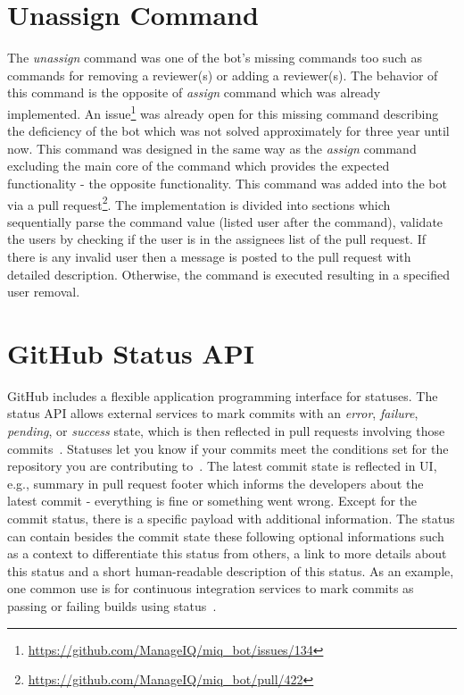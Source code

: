 \section{Unassign Command}

The \textit{unassign} command was one of the bot's missing commands too such as commands for removing a reviewer(s) or adding a reviewer(s). The behavior of this command is the opposite of \textit{assign} command which was already implemented. An issue\footnote{\url{https://github.com/ManageIQ/miq_bot/issues/134}} was already open for this missing command describing the deficiency of the bot which was not solved approximately for three year until now. This command was designed in the same way as the \textit{assign} command excluding the main core of the command which provides the expected functionality - the opposite functionality. This command was added into the bot via a pull request\footnote{\url{https://github.com/ManageIQ/miq_bot/pull/422}}. The implementation is divided into sections which sequentially parse the command value (listed user after the command), validate the users by checking if the user is in the assignees list of the pull request. If there is any invalid user then a message is posted to the pull request with detailed description. Otherwise, the command is executed resulting in a specified user removal.

\section{GitHub Status API}

GitHub includes a flexible application programming interface for statuses. The status API allows external services to mark commits with an \textit{error}, \textit{failure}, \textit{pending}, or \textit{success} state, which is then reflected in pull requests involving those commits~\cite{GITHUB_STATUS_API}. Statuses let you know if your commits meet the conditions set for the repository you are contributing to~\cite{GITHUB_ABOUT_STATUSES}. The latest commit state is reflected in UI, e.g., summary in pull request footer which informs the developers about the latest commit - everything is fine or something went wrong. Except for the commit status, there is a specific payload with additional information. The status can contain besides the commit state these following optional informations such as a context to differentiate this status from others, a link to more details about this status and a short human-readable description of this status. As an example, one common use is for continuous integration services to mark commits as passing or failing builds using status~\cite{GITHUB_STATUS_API}.

